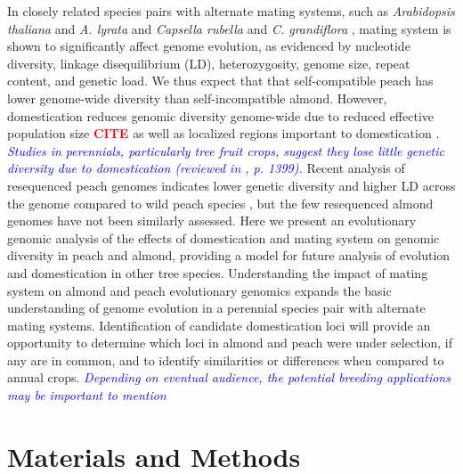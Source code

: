 \documentclass[12pt]{article}
\newcommand{\citex}{\textcolor{red}{\bf CITE }}
\newcommand{\dv}[1]{\textcolor{blue}{\emph{#1}}}
\begin{document}
In closely related species pairs with alternate mating systems, such as \emph{Arabidopsis thaliana} and \emph{A. lyrata} and \emph{Capsella rubella} and \emph{C. grandiflora} \citep{slotte2013capsella}, mating system is shown to significantly affect genome evolution, as evidenced by nucleotide diversity, linkage disequilibrium (LD), heterozygosity, genome size, repeat content, and genetic load.
%
We thus expect that that self-compatible peach has lower genome-wide diversity than self-incompatible almond.
%
However, domestication reduces genomic diversity genome-wide due to reduced effective population size \citex as well as localized regions important to domestication \citep{glemin2006impact, doebley2006molecular}. 
%
\dv{Studies in perennials, particularly tree fruit crops, suggest they lose little genetic diversity due to domestication (reviewed in \citealp{miller2011forest}, p. 1399).}
%
Recent analysis of resequenced peach genomes indicates lower genetic diversity and higher LD across the genome compared to wild peach species \citep{verde2013high}, but the few resequenced almond genomes have not been similarly assessed. 
%
Here we present an evolutionary genomic analysis of the effects of domestication and mating system on genomic diversity in peach and almond, providing a model for future analysis of evolution and domestication in other tree species.
%
Understanding the impact of mating system on almond and peach evolutionary genomics expands the basic understanding of genome evolution in a perennial species pair with alternate mating systems. 
%
Identification of candidate domestication loci will provide an opportunity to determine which loci in almond and peach were under selection, if any are in common, and to identify similarities or differences when compared to annual crops.
%
\dv{Depending on eventual audience, the potential breeding applications may be important to mention}
%
\section*{Materials and Methods}
%
\end{document}
